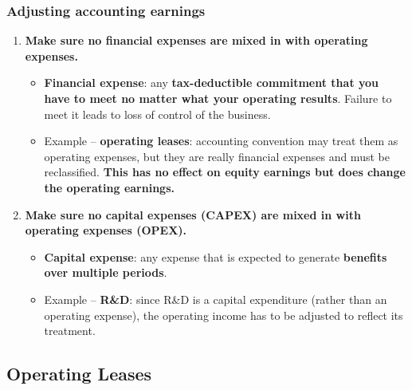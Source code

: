 \subsubsection*{Adjusting accounting earnings}
\begin{enumerate}
  \item \textbf{Make sure no financial expenses are mixed in with operating expenses.}
  \begin{itemize}
    \item \textbf{Financial expense}: any \textbf{tax-deductible commitment that you have to meet no matter what your operating results}. Failure to meet it leads to loss of control of the business.
    \item Example -- \textbf{operating leases}: accounting convention may treat them as operating expenses, but they are really financial expenses and must be reclassified. \textbf{This has no effect on equity earnings but does change the operating earnings.}
  \end{itemize}
  \item \textbf{Make sure no capital expenses (CAPEX) are mixed in with operating expenses (OPEX).}
  \begin{itemize}
    \item \textbf{Capital expense}: any expense that is expected to generate \textbf{benefits over multiple periods}.
    \item Example -- \textbf{R\&D}: since R\&D is a capital expenditure (rather than an operating expense), the operating income has to be adjusted to reflect its treatment.
  \end{itemize}
\end{enumerate}

\subsection{Operating Leases}

\begin{center}
\end{center}

